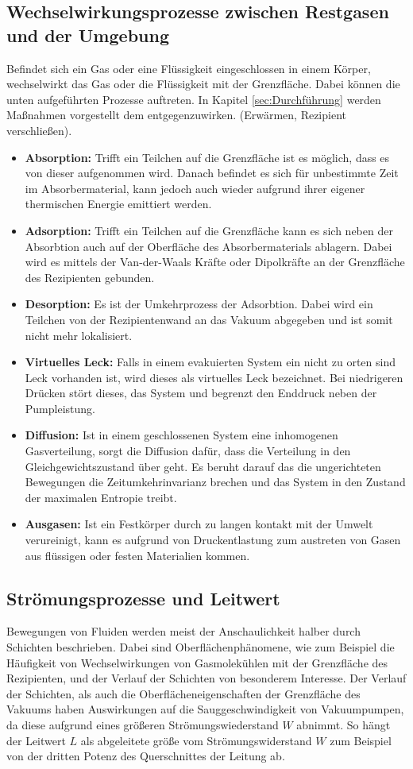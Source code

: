 \subsection{Wechselwirkungsprozesse zwischen Restgasen und der Umgebung}
Befindet sich ein Gas oder eine Flüssigkeit eingeschlossen in einem Körper, wechselwirkt das Gas oder die Flüssigkeit mit der Grenzfläche. Dabei können die unten aufgeführten Prozesse auftreten. In Kapitel \ref{sec:Durchführung} werden Maßnahmen vorgestellt dem entgegenzuwirken. (Erwärmen, Rezipient verschließen).
\begin{itemize}
  \item \textbf{Absorption:} Trifft ein Teilchen auf die Grenzfläche ist es möglich, dass es von dieser aufgenommen wird. Danach befindet es sich für unbestimmte Zeit im Absorbermaterial, kann jedoch auch wieder aufgrund ihrer eigener thermischen Energie emittiert werden.
  \item \textbf{Adsorption:} Trifft ein Teilchen auf die Grenzfläche kann es sich neben der Absorbtion auch auf der Oberfläche des Absorbermaterials ablagern. Dabei wird es mittels der Van-der-Waals Kräfte oder Dipolkräfte an der Grenzfläche des Rezipienten gebunden.
  \item \textbf{Desorption:} Es ist der Umkehrprozess der Adsorbtion. Dabei wird ein Teilchen von der Rezipientenwand an das Vakuum abgegeben und ist somit nicht mehr lokalisiert.
  \item \textbf{Virtuelles Leck:} Falls in einem evakuierten System ein nicht zu orten sind Leck vorhanden ist, wird dieses als virtuelles Leck bezeichnet. Bei niedrigeren Drücken stört dieses, das System und begrenzt den Enddruck neben der Pumpleistung. 
  \item \textbf{Diffusion:} Ist in einem geschlossenen System eine inhomogenen Gasverteilung, sorgt die Diffusion dafür, dass die Verteilung in den Gleichgewichtszustand über geht. Es beruht darauf das die ungerichteten Bewegungen die Zeitumkehrinvarianz brechen und das System in den Zustand der maximalen Entropie treibt.
  \item \textbf{Ausgasen:} Ist ein Festkörper durch zu langen kontakt mit der Umwelt verureinigt, kann es aufgrund von Druckentlastung zum austreten von Gasen aus flüssigen oder festen Materialien kommen.
\end{itemize}
\subsection{Strömungsprozesse und Leitwert}
Bewegungen von Fluiden werden meist der Anschaulichkeit halber durch Schichten beschrieben. Dabei sind Oberflächenphänomene, wie zum Beispiel die Häufigkeit von Wechselwirkungen von Gasmolekühlen mit der Grenzfläche des Rezipienten, und der Verlauf der Schichten von besonderem Interesse. Der Verlauf der Schichten, als auch die Oberflächeneigenschaften der Grenzfläche des Vakuums haben Auswirkungen auf die Sauggeschwindigkeit von Vakuumpumpen, da diese aufgrund eines größeren Strömungswiederstand $W$ abnimmt. So hängt der Leitwert $L$ als abgeleitete größe vom Strömungswiderstand $W$ zum Beispiel von der dritten Potenz des Querschnittes der Leitung ab. \cite{Jena}
